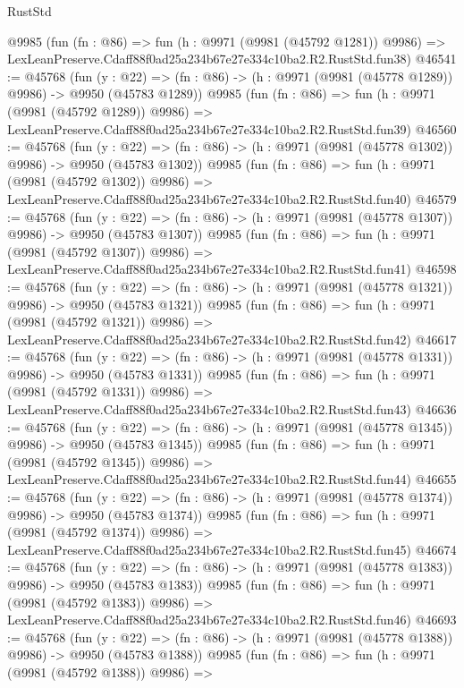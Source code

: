 \begin{lexlean}{RustStd}
\begin{coremodule}
    @9985
    (fun (fn : @86) =>
    fun (h : @9971 (@9981 (@45792 @1281)) @9986) =>
    LexLeanPreserve.Cdaff88f0ad25a234b67e27e334c10ba2.R2.RustStd.fun38)
@46541 := @45768
    (fun (y : @22) =>
    (fn : @86) -> (h : @9971 (@9981 (@45778 @1289)) @9986) -> @9950 (@45783 @1289))
    @9985
    (fun (fn : @86) =>
    fun (h : @9971 (@9981 (@45792 @1289)) @9986) =>
    LexLeanPreserve.Cdaff88f0ad25a234b67e27e334c10ba2.R2.RustStd.fun39)
@46560 := @45768
    (fun (y : @22) =>
    (fn : @86) -> (h : @9971 (@9981 (@45778 @1302)) @9986) -> @9950 (@45783 @1302))
    @9985
    (fun (fn : @86) =>
    fun (h : @9971 (@9981 (@45792 @1302)) @9986) =>
    LexLeanPreserve.Cdaff88f0ad25a234b67e27e334c10ba2.R2.RustStd.fun40)
@46579 := @45768
    (fun (y : @22) =>
    (fn : @86) -> (h : @9971 (@9981 (@45778 @1307)) @9986) -> @9950 (@45783 @1307))
    @9985
    (fun (fn : @86) =>
    fun (h : @9971 (@9981 (@45792 @1307)) @9986) =>
    LexLeanPreserve.Cdaff88f0ad25a234b67e27e334c10ba2.R2.RustStd.fun41)
@46598 := @45768
    (fun (y : @22) =>
    (fn : @86) -> (h : @9971 (@9981 (@45778 @1321)) @9986) -> @9950 (@45783 @1321))
    @9985
    (fun (fn : @86) =>
    fun (h : @9971 (@9981 (@45792 @1321)) @9986) =>
    LexLeanPreserve.Cdaff88f0ad25a234b67e27e334c10ba2.R2.RustStd.fun42)
@46617 := @45768
    (fun (y : @22) =>
    (fn : @86) -> (h : @9971 (@9981 (@45778 @1331)) @9986) -> @9950 (@45783 @1331))
    @9985
    (fun (fn : @86) =>
    fun (h : @9971 (@9981 (@45792 @1331)) @9986) =>
    LexLeanPreserve.Cdaff88f0ad25a234b67e27e334c10ba2.R2.RustStd.fun43)
@46636 := @45768
    (fun (y : @22) =>
    (fn : @86) -> (h : @9971 (@9981 (@45778 @1345)) @9986) -> @9950 (@45783 @1345))
    @9985
    (fun (fn : @86) =>
    fun (h : @9971 (@9981 (@45792 @1345)) @9986) =>
    LexLeanPreserve.Cdaff88f0ad25a234b67e27e334c10ba2.R2.RustStd.fun44)
@46655 := @45768
    (fun (y : @22) =>
    (fn : @86) -> (h : @9971 (@9981 (@45778 @1374)) @9986) -> @9950 (@45783 @1374))
    @9985
    (fun (fn : @86) =>
    fun (h : @9971 (@9981 (@45792 @1374)) @9986) =>
    LexLeanPreserve.Cdaff88f0ad25a234b67e27e334c10ba2.R2.RustStd.fun45)
@46674 := @45768
    (fun (y : @22) =>
    (fn : @86) -> (h : @9971 (@9981 (@45778 @1383)) @9986) -> @9950 (@45783 @1383))
    @9985
    (fun (fn : @86) =>
    fun (h : @9971 (@9981 (@45792 @1383)) @9986) =>
    LexLeanPreserve.Cdaff88f0ad25a234b67e27e334c10ba2.R2.RustStd.fun46)
@46693 := @45768
    (fun (y : @22) =>
    (fn : @86) -> (h : @9971 (@9981 (@45778 @1388)) @9986) -> @9950 (@45783 @1388))
    @9985
    (fun (fn : @86) =>
    fun (h : @9971 (@9981 (@45792 @1388)) @9986) =>

\end{coremodule}
\end{lexlean}
